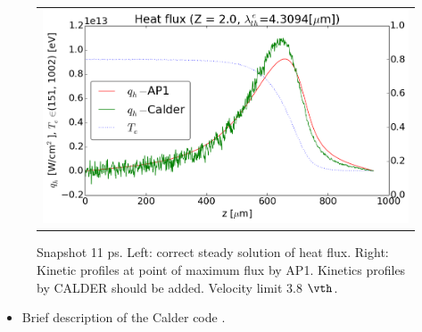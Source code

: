 \begin{figure}[tbh]
  \begin{center}
    \begin{tabular}{c}
      \includegraphics[width=\figscale\textwidth]{../VFPdata/C7_Calder_case1_heatflux.png} 
    \end{tabular}
  \caption{  
  Snapshot 11 ps. Left: correct steady solution of heat flux. 
  Right: Kinetic profiles at point of maximum flux by AP1. 
  Kinetics profiles by CALDER should be added. Velocity limit 3.8 $\vth$.
  }
  \label{fig:C7_Calder_case1}
  \end{center} 
\end{figure}

\begin{itemize}
  \item Brief description of the Calder code .
\end{itemize}
